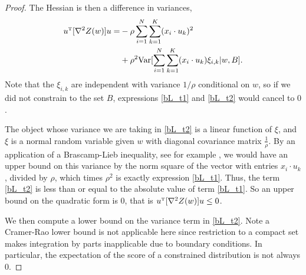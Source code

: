 \documentclass{article}
\numberwithin{equation}{section}
\theoremstyle{Lemma}
\theoremstyle{Corollary}
\theoremstyle{Theorem}
\theoremstyle{Remark}
\begin{document}
\begin{proof}
The Hessian is then a difference in variances,
    \begin{align}
        u^{\text{\tiny{T}}}[\nabla^{2} Z(w)]u=& -\rho \sum_{i=1}^{N}\sum_{k=1}^{K}(x_{i}\cdot u_{k})^{2}\label{bL_t1}\\
        &+\rho^{2}\text{Var}[\sum_{i=1}^{N}\sum_{k=1}^{K}(x_{i}\cdot u_{k})\xi_{i,k}|w,B]\label{bL_t2}.
    \end{align}
Note that the $\xi_{i,k}$ are independent with variance $1/\rho$ conditional on $w$, so if we did not constrain to the set $B$, expressions \eqref{bL_t1} and \eqref{bL_t2} would cancel to $0$. 

The object whose variance we are taking in \eqref{bL_t2} is a linear function of $\xi$, and $\xi$ is a normal random variable given $w$ with diagonal covariance matrix $\frac{1}{\rho}$. By an application of a Brascamp-Lieb inequality, see for example \cite[Proposition 2.1]{bobkov2000brunn}, we would have an upper bound on this variance by the norm square of the vector with entries $x_i \cdot u_k$, divided by $\rho$, which times $\rho^{2}$ is exactly expression \eqref{bL_t1}. Thus, the term \eqref{bL_t2} is less than or equal to the absolute value of term \eqref{bL_t1}. So an upper bound on the quadratic form is $0$, that is $u^{\text{\tiny{T}}}[\nabla^{2}Z(w)]u \leq 0$.

We then compute a lower bound on the variance term in \eqref{bL_t2}. Note a Cramer-Rao lower bound is not applicable here since restriction to a compact set makes integration by parts inapplicable due to boundary conditions. In particular, the expectation of the score of a constrained distribution is not always $0$. 


\end{proof}
\end{document}

